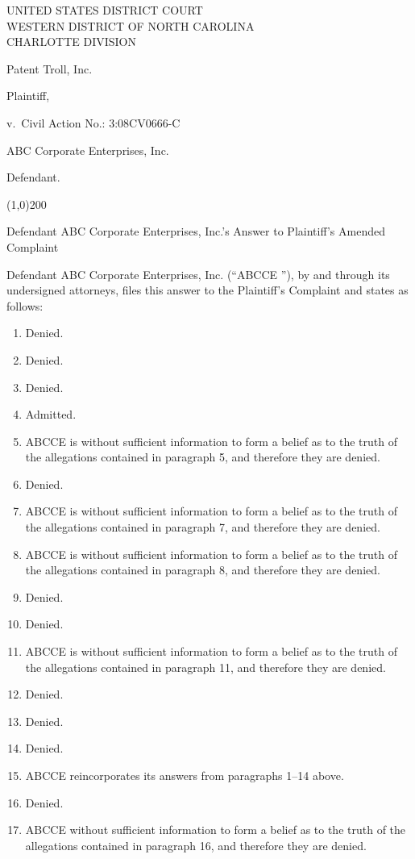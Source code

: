 \documentclass[12pt]{article}
\newcommand{\client}{ABC Corporate Enterprises, Inc. }
\newcommand{\csn}{ABCCE }
\begin{document}
\singlespacing

\begin{center}
UNITED STATES DISTRICT COURT\\
WESTERN DISTRICT OF NORTH CAROLINA\\
CHARLOTTE DIVISION\\
\end{center}

\doublespacing

\noindent Patent Troll, Inc.

\noindent \hspace{2cm}Plaintiff,

\noindent v.\ \hspace{9cm}Civil Action No.:  3:08CV0666-C

\noindent \client

\noindent \hspace{2cm}Defendant.\

\noindent \line(1,0){200}

\singlespacing
\begin{center}
Defendant ABC Corporate Enterprises, Inc.'s Answer to Plaintiff's Amended Complaint
\end{center}

\doublespacing

Defendant \client (``\csn''), by and through its undersigned attorneys, files this answer to the Plaintiff's Complaint and states as follows:

\begin{enumerate}
\item Denied.
\item Denied.
\item Denied.
\item Admitted.
\item \csn is without sufficient information to form a belief as to the truth of the allegations contained in paragraph 5, and therefore they are denied.
\item Denied.
\item \csn is without sufficient information to form a belief as to the truth of the allegations contained in paragraph 7, and therefore they are denied.
\item \csn is without sufficient information to form a belief as to the truth of the allegations contained in paragraph 8, and therefore they are denied.
\item Denied.
\item Denied.
\item \csn is without sufficient information to form a belief as to the truth of the allegations contained in paragraph 11, and therefore they are denied.
\item Denied.
\item Denied.
\item Denied.
\item \csn reincorporates its answers from paragraphs 1--14 above.
\item Denied.
\item \csn without sufficient information to form a belief as to the truth of the allegations contained in paragraph 16, and therefore they are denied.
\end{enumerate}
\end{document}
